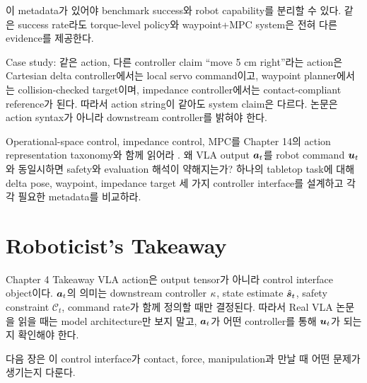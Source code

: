 이 metadata가 있어야 benchmark success와 robot capability를 분리할 수 있다. 같은 success rate라도 torque-level policy와 waypoint+MPC system은 전혀 다른 evidence를 제공한다.

\begin{casebox}{Case study: 같은 action, 다른 controller claim}
``move 5 cm right''라는 action은 Cartesian delta controller에서는 local servo command이고, waypoint planner에서는 collision-checked target이며, impedance controller에서는 contact-compliant reference가 된다. 따라서 action string이 같아도 system claim은 다르다. 논문은 action syntax가 아니라 downstream controller를 밝혀야 한다.
\end{casebox}

\chapterwork
{Operational-space control, impedance control, MPC를 Chapter 14의 action representation taxonomy와 함께 읽어라 \cite{khatib1987,hogan1985,mayne2000}.}
{왜 VLA output $\bm{a}_t$를 robot command $\bm{u}_t$와 동일시하면 safety와 evaluation 해석이 약해지는가?}
{하나의 tabletop task에 대해 delta pose, waypoint, impedance target 세 가지 controller interface를 설계하고 각각 필요한 metadata를 비교하라.}

\section{Roboticist's Takeaway}

\begin{definitionbox}{Chapter 4 Takeaway}
VLA action은 output tensor가 아니라 control interface object이다. $\bm{a}_t$의 의미는 downstream controller $\kappa$, state estimate $\hat{\bm{s}}_t$, safety constraint $\mathcal{C}_t$, command rate가 함께 정의할 때만 결정된다. 따라서 Real VLA 논문을 읽을 때는 model architecture만 보지 말고, $\bm{a}_t$가 어떤 controller를 통해 $\bm{u}_t$가 되는지 확인해야 한다.
\end{definitionbox}

다음 장은 이 control interface가 contact, force, manipulation과 만날 때 어떤 문제가 생기는지 다룬다.
